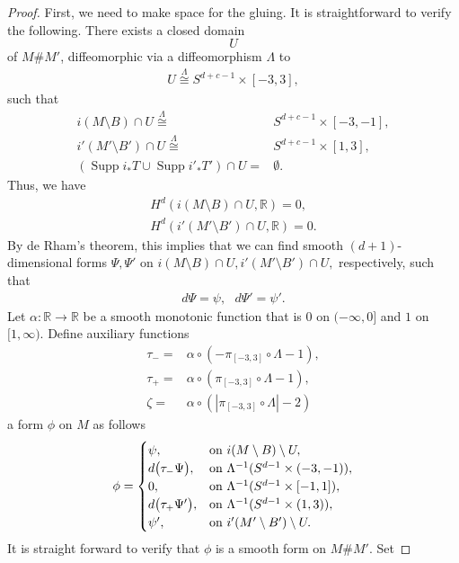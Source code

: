 \documentclass[11pt,a4paper]{amsart}
\numberwithin{equation}{section}
\newcommand{\supp}{\operatorname{Supp}}
\newcommand{\ai}{\alpha}
\newcommand{\es}{\emptyset}
\newcommand{\pf}{_\ast}
\newcommand{\m}{^{-1}}
\newcommand{\imb}{i(M\setminus B)}
\newcommand{\imbb}{i'(M'\setminus B')}
\newcommand{\R}{\mathbb{R}}
\theoremstyle{plain}
\theoremstyle{definition}
\numberwithin{equation}{subsection}
\begin{document}
\begin{proof}
		First, we need to make space for the gluing. It is straightforward to verify the following. There exists a closed domain $$U$$ of $M\# M'$, diffeomorphic via a diffeomorphism $\Lambda$ to
		\begin{align*}
			U\overset{\Lambda}{\cong} S^{d+c-1}\times[-3,3],
		\end{align*}
		such that
		\begin{align}
			i(M\setminus B)\cap U\overset{{\Lambda}}{\cong}& S^{d+c-1}\times[-3,-1],\\
			i'(M'\setminus B')\cap U\overset{\Lambda}{\cong}& S^{d+c-1}\times[1,3],\\
			\label{suppuu}(\supp i\pf T\cup \supp i'\pf T')\cap U=&\es.
		\end{align}
		Thus, we have
		\begin{align*}
			H^d(i(M\setminus B)\cap U,\R)=0,\\
			H^d(i'(M'\setminus B')\cap U,\R)=0.
		\end{align*}
		By de Rham's theorem, this implies that we can find smooth $(d+1)$-dimensional forms $\Psi,\Psi'$ on $\imb\cap U,\imbb\cap U,$ respectively, such that
		\begin{align*}
			d\Psi=\psi,\textbf{ }d\Psi'=\psi'.
		\end{align*}
		Let $\ai:\R\to\R$ be a smooth monotonic function that is $0$ on $(-\infty,0]$ and $1$ on $[1,\infty)$. 	Define auxiliary functions
		\begin{align*}
			\tau_{-}=&\ai\circ(-\pi_{[-3,3]}\circ\Lambda -1),\\
			\tau_+=&\ai\circ(\pi_{[-3,3]}\circ\Lambda -1),\\
			\zeta=&\ai\circ(|\pi_{[-3,3]}\circ\Lambda|-2)
		\end{align*}a form $\phi$ on $M$ as follows
		\begin{align*}
			\phi=\begin{cases}
				\psi,&\textnormal{on }\imb\setminus U,\\
				d\big(\tau_-\Psi\big),&\textnormal{on }\Lambda\m (S^{d-1}\times(-3,-1)),\\
				0,&\textnormal{on }\Lambda\m(S^{d-1}\times[-1,1]),\\
				d\big(\tau_+\Psi'\big),&\textnormal{on }\Lambda\m (S^{d-1}\times(1,3)),\\	\psi',&\textnormal{on }\imbb\setminus U.
			\end{cases}
		\end{align*}	It is straight forward to verify that $\phi$ is a smooth form on $M\# M'$. Set

\end{proof}
\end{document}
